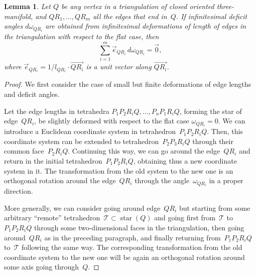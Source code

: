 \documentclass[11pt]{article}
\newtheorem{lemma}{Lemma}
\DeclareMathOperator{\St}{star}
\begin{document}
\begin{lemma}
\label{lemma_infinitesimal}
Let $Q$ be any vertex in a triangulation of closed oriented three-manifold, and $QR_1,\ldots,\allowbreak QR_m$ all the edges that end in~$Q$. If infinitesimal deficit angles $d\omega_{QR_i}$ are obtained from infinitesimal deformations of length of edges in the triangulation with respect to the flat case, then{\samepage
\begin{equation}
\sum_{i=1}^m \vec e_{QR_i}\, d\omega_{QR_i} = \vec 0,
\label{eq_zero_for_dx*}
\end{equation}
where $\vec e_{QR_i}=1/l_{QR_i} \cdot \overrightarrow{QR_i}$ is a unit vector along $\overrightarrow{QR_i}$.}
\end{lemma}

\begin{proof}
We f\/irst consider the case of small but f\/inite deformations of edge lengths and def\/icit angles.

Let the edge lengths in tetrahedra $P_1P_2R_iQ, \ldots, P_nP_1R_iQ$, forming the star of edge~$QR_i$, be slightly deformed with respect to the f\/lat case $\omega_{QR_i}=0$. We can introduce a Euclidean coordinate system in tetrahedron~$P_1P_2R_iQ$. Then, this coordinate system can be extended to tetrahedron~$P_2P_3R_iQ$ through their common face~$P_2R_iQ$. Continuing this way, we can go around the edge~$QR_i$ and return in the initial tetrahedron~$P_1P_2R_iQ$, obtaining thus a new coordinate system in it. The transformation from the old system to the new one is an orthogonal rotation around the edge~$QR_i$ through the angle~$\omega_{QR_i}$ in a proper direction.

More generally, we can consider going around edge~$QR_i$ but starting from some arbitrary ``remote'' tetrahedron~$\mathcal T \subset \St(Q)$ and going f\/irst from~$\mathcal T$ to~$P_1P_2R_iQ$ through some two-dimen\-sion\-al faces in the triangulation, then going around~$QR_i$ as in the preceding paragraph, and f\/inally returning from~$P_1P_2R_iQ$ to~$\mathcal T$ following the same way. The corresponding transformation from the old coordinate system to the new one will be again an orthogonal rotation around some axis going through~$Q$.


\end{proof}
\end{document}
